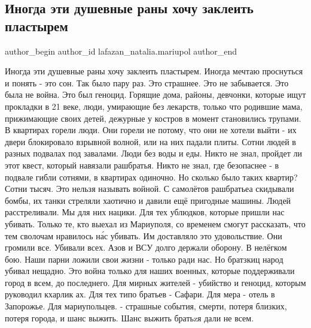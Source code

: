  
 
 
 
 

\subsection{Иногда эти душевные раны хочу заклеить пластырем}
\label{sec:24_03_2023.fb.lafazan_natalia.mariupol.1.rany_plastyr}

\ifcmt
 author_begin
   author_id lafazan_natalia.mariupol
 author_end
\fi

Иногда эти душевные раны хочу заклеить пластырем. Иногда мечтаю проснуться и
понять - это сон. Так было пару раз. Это страшнее. Это не забывается. Это была
не война. Это был геноцид. Горящие дома, районы, девчонки, которые ищут
прокладки в 21 веке, люди,  умирающие без лекарств, только что родившие мама,
прижимающие своих детей, дежурные у костров в момент становились трупами. В
квартирах горели люди. Они горели не потому, что они не хотели выйти - их двери
блокировало взрывной волной, или на них падали плиты. Сотни людей в разных
подвалах под завалами. Люди без воды и еды. Никто не знал, пройдет ли этот
квест, который навязали рашбратья. Никто не знал, где безопаснее - в подвале
гибли сотнями, в квартирах одиночно. Но сколько было таких квартир? Сотни
тысяч. Это нельзя называть войной. С самолётов рашбратьеа скидывали бомбы, их
танки стреляли хаотично и давили ещё пригодные машины. Людей расстреливали. Мы
для них нацики. Для тех ублюдков, которые пришли нас убивать. Только те, кто
выехал из Мариуполя, со временем смогут рассказать, что тем сволочам нравилось
на́с убивать. Им доставляло это удовольствие. Они громили все. Убивали всех.
Азов и ВСУ долго держали оборону. В нелёгком бою. Наши парни ложили свои жизни
- только ради нас. Но братзкиц народ убивал нещадно. Это война только для наших
военных, которые поддерживали город в всем, до последнего. Для мирных жителей -
убийство и геноцид, которым руководил кхарлик  ах. Для тех типо братьев -
Сафари. Для мера - отель в Запорожье. Для мариупольцев. - страшные события,
смерти, потеря близких, потеря города, и шанс выжить. Шанс выжить братьzя дали
не всем.

